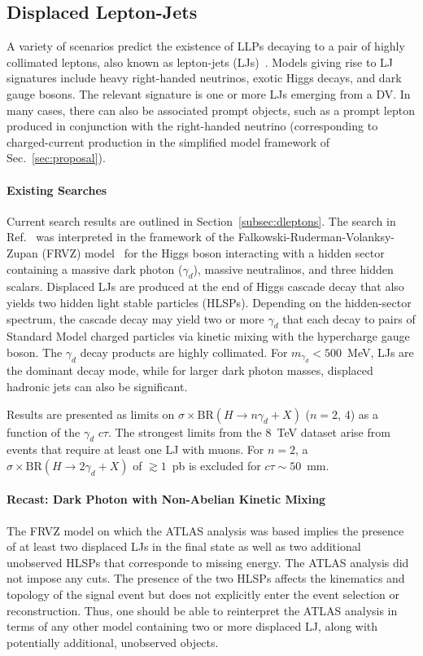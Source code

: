\subsection{Displaced Lepton-Jets}

A variety of scenarios predict the existence of LLPs decaying to a pair of highly collimated leptons, also known as lepton-jets (LJs)~\cite{ArkaniHamed:2008qp}. Models giving rise to LJ signatures include heavy right-handed neutrinos, exotic Higgs decays, and dark gauge bosons. The relevant signature is one or more LJs emerging from a DV. In many cases, there can also be associated prompt objects, such as a prompt lepton produced in conjunction with the right-handed neutrino (corresponding to charged-current production in the simplified model framework of Sec.~\ref{sec:proposal}).

\paragraph {Existing Searches} Current search results are outlined in Section~\ref{subsec:dleptons}. The search in Ref.~\cite{ATLAS-CONF-2016-042} was interpreted in the framework of the Falkowski-Ruderman-Volanksy-Zupan (FRVZ) model~\cite{Falkowski:2010cm} for the Higgs boson interacting with a hidden sector containing a massive dark photon ($\gamma_d$), massive neutralinos, and three hidden scalars. Displaced LJs are produced at the end of Higgs cascade decay that also yields two hidden light stable particles (HLSPs). Depending on the hidden-sector spectrum, the cascade decay may yield two or more $\gamma_d$ that each decay to pairs of Standard Model charged particles via kinetic mixing with the hypercharge gauge boson. The $\gamma_d$ decay products are highly collimated. For $m_{\gamma_d} < 500$~MeV, LJs are the dominant decay mode, while for larger dark photon masses, displaced hadronic jets can also be significant.

Results are presented as limits on $\sigma\times \mathrm{BR}(H\to n\gamma_d+X)$ ($n=2$, 4) as a function of the $\gamma_d$ $c\tau$. The strongest limits from the 8~TeV dataset arise from events that require at least one LJ with muons. For $n=2$, a $\sigma\times \mathrm{BR}(H\to 2\gamma_d+X)$ of $\gtrsim1$~pb is excluded for $c\tau\sim 50$~mm.

\paragraph {Recast: Dark Photon with Non-Abelian Kinetic Mixing} The FRVZ model on which the ATLAS analysis was based implies the presence of at least two displaced LJs in the final state as well as two additional unobserved HLSPs that corresponde to missing energy. The ATLAS analysis did not impose any \MET cuts. The presence of the two HLSPs affects the kinematics and topology of the signal event but does not explicitly enter the event selection or reconstruction. Thus, one should be able to reinterpret the ATLAS analysis in terms of any other model containing two or more displaced LJ, along with potentially additional, unobserved objects.


